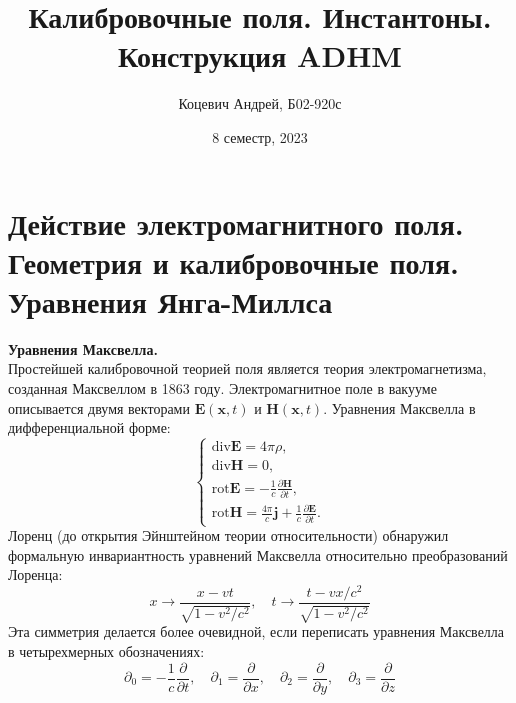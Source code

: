 \documentclass[12pt]{article}
\title{Калибровочные поля. Инстантоны. Конструкция ADHM}
\author{Коцевич Андрей, Б02-920с}
\date{8 семестр, 2023}
\theoremstyle{definition}
\begin{document}
\maketitle
\newpage
\tableofcontents{}
\newpage
\section{Действие электромагнитного поля. Геометрия и калибровочные поля. Уравнения Янга-Миллса}
\textbf{Уравнения Максвелла.}\\
Простейшей калибровочной теорией поля является теория электромагнетизма, созданная Максвеллом в 1863 году. Электромагнитное поле в вакууме описывается двумя векторами $\bm{E}(\bm{x},t)$ и $\bm{H}(\bm{x},t)$. Уравнения Максвелла в дифференциальной форме:
\begin{equation}
    \begin{cases}
        \text{div}\bm{E}=4\pi\rho,\\
        \text{div}\bm{H}=0,\\
        \text{rot}\bm{E}=-\frac{1}{c}\frac{\partial\bm{H}}{\partial t},\\
        \text{rot}\bm{H}=\frac{4\pi}{c}\bm{j}+\frac{1}{c}\frac{\partial\bm{E}}{\partial t}.
    \end{cases}
\end{equation}
Лоренц (до открытия Эйнштейном теории относительности) обнаружил формальную инвариантность уравнений Максвелла относительно преобразований Лоренца:
\begin{equation}
    x\rightarrow\frac{x-vt}{\sqrt{1-v^2/c^2}},\quad t\rightarrow\frac{t-vx/c^2}{\sqrt{1-v^2/c^2}}
\end{equation}
Эта симметрия делается более очевидной, если переписать уравнения Максвелла в четырехмерных обозначениях:
\begin{equation}
    \partial_0=-\frac{1}{c}\frac{\partial}{\partial t},\quad\partial_1=\frac{\partial}{\partial x},\quad\partial_2=\frac{\partial}{\partial y},\quad\partial_3=\frac{\partial}{\partial z}
\end{equation}
\end{document}
